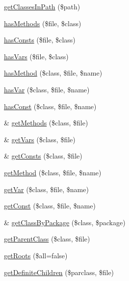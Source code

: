 \begin{DoxyCompactItemize}
\hyperlink{class_classes_aeb105407a73f5c5b10bc21a783a7f3f2}{get\-Classes\-In\-Path} (\$path)
\item 
\hyperlink{class_classes_a1e54fbcca9292a262bdb567546ff9210}{has\-Methods} (\$file, \$class)
\item 
\hyperlink{class_classes_a13786226ab3faf9ce9252e03fbca13fd}{has\-Consts} (\$file, \$class)
\item 
\hyperlink{class_classes_a1254946c25d189e8407d05e37fcd6f6f}{has\-Vars} (\$file, \$class)
\item 
\hyperlink{class_classes_ae4f55af5e06d901bafeee7faea4b2ac2}{has\-Method} (\$class, \$file, \$name)
\item 
\hyperlink{class_classes_a6041b4cbddcbf696ce859ea1f50cfe27}{has\-Var} (\$class, \$file, \$name)
\item 
\hyperlink{class_classes_ac68cf801d1cca5efc705b998626bfedd}{has\-Const} (\$class, \$file, \$name)
\item 
\& \hyperlink{class_classes_ab66c3741e52c0b4e83be210f9b085a9c}{get\-Methods} (\$class, \$file)
\item 
\& \hyperlink{class_classes_ade7a1a2a74c40caf355f3242dbe91ec5}{get\-Vars} (\$class, \$file)
\item 
\& \hyperlink{class_classes_a9aa7d588b02bc601a5f092dd621181dc}{get\-Consts} (\$class, \$file)
\item 
\hyperlink{class_classes_acba829361266566e11925efcfcb0b263}{get\-Method} (\$class, \$file, \$name)
\item 
\hyperlink{class_classes_a9930083b806dd1a75cb854be14874107}{get\-Var} (\$class, \$file, \$name)
\item 
\hyperlink{class_classes_a4ba98263b2b169687884322e04e4d5f6}{get\-Const} (\$class, \$file, \$name)
\item 
\& \hyperlink{class_classes_aff1a87aa303dc3d6d45b94d42bd014da}{get\-Class\-By\-Package} (\$class, \$package)
\item 
\hyperlink{class_classes_a812a6f2ac0e3f1c5bcece134507c70ed}{get\-Parent\-Class} (\$class, \$file)
\item 
\hyperlink{class_classes_ad19bad459b32597136b5c75612a9845b}{get\-Roots} (\$all=false)
\item 
\hyperlink{class_classes_a28d4d226456e1f3e60710d61f9aaf60d}{get\-Definite\-Children} (\$parclass, \$file)
\end{DoxyCompactItemize}
